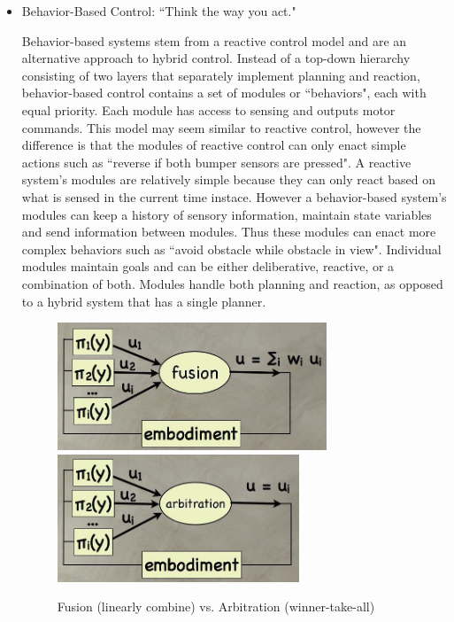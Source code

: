 \begin{itemize}
\item Behavior-Based Control: ``Think the way you act."

Behavior-based systems stem from a reactive control model and are an alternative approach to hybrid control. Instead of a top-down hierarchy consisting of two layers that separately implement planning and reaction, behavior-based control contains a set of modules or ``behaviors", each with equal priority. Each module has access to sensing and outputs motor commands. This model may seem similar to reactive control, however the difference is that the modules of reactive control can only enact simple actions such as ``reverse if both bumper sensors are pressed". A reactive system's modules are relatively simple because they can only react based on what is sensed in the current time instace. However a behavior-based system's modules can keep a history of sensory information, maintain state variables and send information between modules. Thus these modules can enact more complex behaviors such as ``avoid obstacle while obstacle in view". Individual modules maintain goals and can be either deliberative, reactive, or a combination of both. Modules handle both planning and reaction, as opposed to a hybrid system that has a single planner.

\begin{figure}[!h]
\centerline{
\mbox{\includegraphics[height=1.5in]{figures/5_fusion.jpg}}
\mbox{\includegraphics[height=1.5in]{figures/5_arbitration.jpg}}
}
\caption{Fusion (linearly combine) vs. Arbitration (winner-take-all)}
\end{figure}



\end{itemize}
